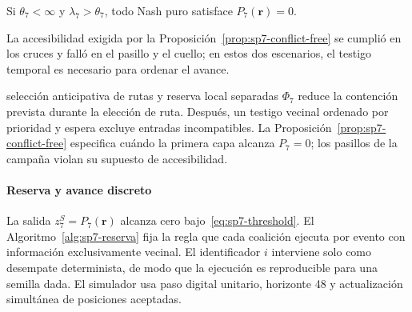 \begin{proposicion}
\label{prop:sp7-conflict-free}
Si $\theta_7<\infty$ y $\lambda_7>\theta_7$, todo Nash puro satisface $P_7(\boldsymbol r)=0$.
\end{proposicion}

La accesibilidad exigida por la Proposición~\ref{prop:sp7-conflict-free} se cumplió en los cruces y falló en el pasillo y el cuello; en estos dos escenarios, el testigo temporal es necesario para ordenar el avance.

\begin{samepage}
\begin{contribucion}{selección anticipativa de rutas y reserva local separadas}
$\Phi_7$ reduce la contención prevista durante la elección de ruta. Después, un testigo vecinal ordenado por prioridad y espera excluye entradas incompatibles. La Proposición~\ref{prop:sp7-conflict-free} especifica cuándo la primera capa alcanza $P_7=0$; los pasillos de la campaña violan su supuesto de accesibilidad.
\end{contribucion}
\end{samepage}

\paragraph{Reserva y avance discreto}

La salida $z_7^S=P_7(\boldsymbol r)$ alcanza cero bajo~\eqref{eq:sp7-threshold}. El
Algoritmo~\ref{alg:sp7-reserva} fija la regla que cada coalición ejecuta por
evento con información exclusivamente vecinal. El identificador $i$ interviene
solo como desempate determinista, de modo que la ejecución es reproducible para
una semilla dada. El simulador usa paso digital unitario, horizonte 48 y
actualización simultánea de posiciones aceptadas.

